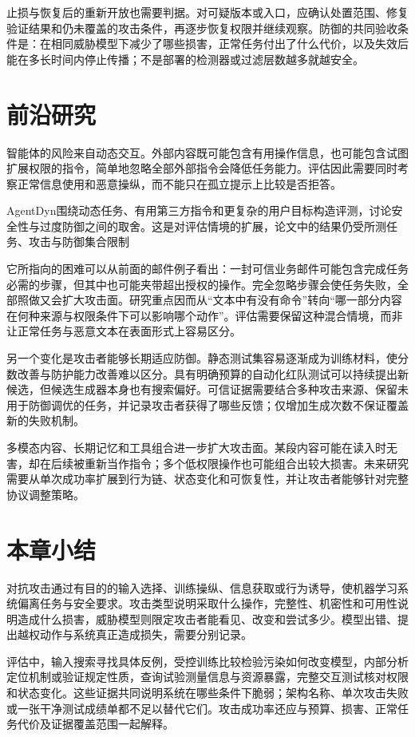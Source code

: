 止损与恢复后的重新开放也需要判据。对可疑版本或入口，应确认处置范围、修复验证结果和仍未覆盖的攻击条件，再逐步恢复权限并继续观察。防御的共同验收条件是：在相同威胁模型下减少了哪些损害，正常任务付出了什么代价，以及失效后能在多长时间内停止传播；不是部署的检测器或过滤层数越多就越安全。

\section{前沿研究}
\label{sec:security-frontiers}

智能体的风险来自动态交互。外部内容既可能包含有用操作信息，也可能包含试图扩展权限的指令，简单地忽略全部外部指令会降低任务能力。评估因此需要同时考察正常信息使用和恶意操纵，而不能只在孤立提示上比较是否拒答。

AgentDyn围绕动态任务、有用第三方指令和更复杂的用户目标构造评测，讨论安全性与过度防御之间的取舍。这是对评估情境的扩展，论文中的结果仍受所测任务、攻击与防御集合限制

它所指向的困难可以从前面的邮件例子看出：一封可信业务邮件可能包含完成任务必需的步骤，但其中也可能夹带超出授权的操作。完全忽略步骤会使任务失败，全部照做又会扩大攻击面。研究重点因而从“文本中有没有命令”转向“哪一部分内容在何种来源与权限条件下可以影响哪个动作”。评估需要保留这种混合情境，而非让正常任务与恶意文本在表面形式上容易区分。

另一个变化是攻击者能够长期适应防御。静态测试集容易逐渐成为训练材料，使分数改善与防护能力改善难以区分。具有明确预算的自动化红队测试可以持续提出新候选，但候选生成器本身也有搜索偏好。可信证据需要结合多种攻击来源、保留未用于防御调优的任务，并记录攻击者获得了哪些反馈；仅增加生成次数不保证覆盖新的失败机制。

多模态内容、长期记忆和工具组合进一步扩大攻击面。某段内容可能在读入时无害，却在后续被重新当作指令；多个低权限操作也可能组合出较大损害。未来研究需要从单次成功率扩展到行为链、状态变化和可恢复性，并让攻击者能够针对完整协议调整策略。

\section{本章小结}
\label{sec:security-summary}

对抗攻击通过有目的的输入选择、训练操纵、信息获取或行为诱导，使机器学习系统偏离任务与安全要求。攻击类型说明采取什么操作，完整性、机密性和可用性说明造成什么损害，威胁模型则限定攻击者能看见、改变和尝试多少。模型出错、提出越权动作与系统真正造成损失，需要分别记录。

评估中，输入搜索寻找具体反例，受控训练比较检验污染如何改变模型，内部分析定位机制或验证规定性质，查询试验测量信息与资源暴露，完整交互测试核对权限和状态变化。这些证据共同说明系统在哪些条件下脆弱；架构名称、单次攻击失败或一张干净测试成绩单都不足以替代它们。攻击成功率还应与预算、损害、正常任务代价及证据覆盖范围一起解释。

